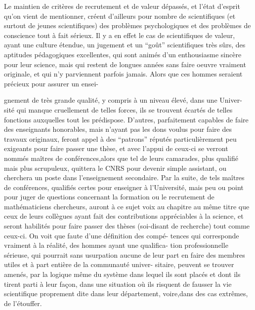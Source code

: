 \documentclass[11pt]{article}
\newcommand{\scanpage}[1]{\par\bigskip\noindent{\small\sffamily[scan #1]}\par}
\newcommand{\mspage}[1]{{\small\sffamily[p.\,#1]}}
\newcommand{\hand}[1]{\textcolor{blue}{#1}}
\begin{document}
Le maintien de critères de recrutement et de valeur dépassés, et
l'état d'esprit qu'on vient de mentionner, créent d'ailleurs pour nombre de
scientifiques (et surtout de jeunes scientifiques) des problèmes psychologiques
et des problèmes de conscience tout à fait sérieux. Il y a en effet le cas
de scientifiques de valeur, ayant une culture étendue, un jugement et un
``goût'' scientifiques très sûrs, des aptitudes pédagogiques excellentes, qui
sont animés d'un enthousiasme sincère pour leur science, mais qui restent
de longues années sans faire oeuvre vraiment originale, et qui n'y parviennent
parfois jamais. Alors que ces hommes seraient précieux pour assurer un ensei-%

\mspage{\hand{257}}

\clearpage
\scanpage{119/258}
\mspage{5}

gnement de très grande qualité, y compris à un niveau élevé, dans une Univer-%
sité qui manque cruellement de telles forces, ils se trouvent écartés de telles
fonctions auxquelles tout les prédispose. D'autres, parfaitement capables de
faire des enseignants honorables, mais n'ayant pas les dons voulus pour faire
des travaux originaux, feront appel à des ``patrons'' réputés particulièrement
peu exigeants pour faire passer une thèse, et avec l'appui de ceux-ci se
verront nommés maîtres de conférences,alors que tel de leurs camarades, plus
qualifié mais plus scrupuleux, quittera le CNRS pour devenir simple assistant,
ou cherchera un poste dans l'enseignement secondaire. Par la suite, de tels
maîtres de conférences, qualifiés certes pour enseigner à l'Université, mais
peu ou point pour juger de questions concernant la formation ou le recrutement
de mathématiciens chercheurs, auront à ce sujet voix au chapitre au même
titre que ceux de leurs collègues ayant fait des contributions appréciables
à la science, et seront habilités pour faire passer des thèses (soi-disant de
recherche) tout comme ceux-ci. On voit que faute d'une définition des compé-%
tences qui corresponde vraiment à la réalité, des hommes ayant une qualifica-%
tion professionnelle sérieuse, qui pourrait sans usurpation aucune de leur
part en faire des membres utiles et à part entière de la communauté univer-%
sitaire, peuvent se trouver amenés, par la logique même du système dans
lequel ils sont placés et dont ils tirent parti à leur façon, dans une
situation où ils risquent de fausser la vie scientifique proprement dite
dans leur département, voire,dans des cas extrêmes, de l'étouffer.
\end{document}
